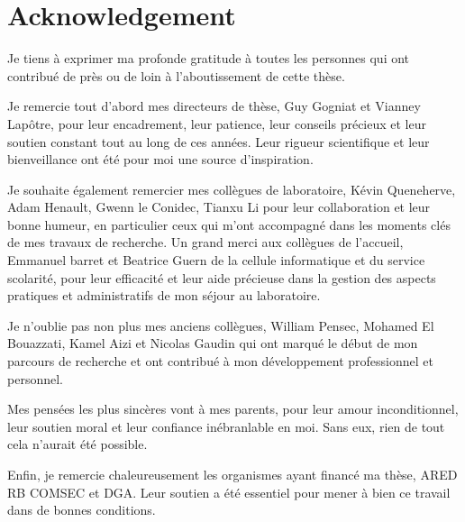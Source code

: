 \chapter*{Acknowledgement}

Je tiens à exprimer ma profonde gratitude à toutes les personnes qui ont contribué de près ou de loin à l’aboutissement de cette thèse.

Je remercie tout d’abord mes directeurs de thèse, Guy Gogniat et Vianney Lapôtre, pour leur encadrement, leur patience, leur conseils précieux et leur soutien constant tout au long de ces années. Leur rigueur scientifique et leur bienveillance ont été pour moi une source d’inspiration.

Je souhaite également remercier mes collègues de laboratoire, Kévin Queneherve, Adam Henault, Gwenn le Conidec, Tianxu Li pour leur collaboration et leur bonne humeur, en particulier ceux qui m’ont accompagné dans les moments clés de mes travaux de recherche. Un grand merci aux collègues de l’accueil, Emmanuel barret et Beatrice Guern de la cellule informatique et du service scolarité, pour leur efficacité et leur aide précieuse dans la gestion des aspects pratiques et administratifs de mon séjour au laboratoire.

Je n’oublie pas non plus mes anciens collègues, William Pensec, Mohamed El Bouazzati, Kamel Aizi et Nicolas Gaudin qui ont marqué le début de mon parcours de recherche et ont contribué à mon développement professionnel et personnel.

Mes pensées les plus sincères vont à mes parents, pour leur amour inconditionnel, leur soutien moral et leur confiance inébranlable en moi. Sans eux, rien de tout cela n’aurait été possible.

Enfin, je remercie chaleureusement les organismes ayant financé ma thèse, ARED RB COMSEC et DGA. Leur soutien a été essentiel pour mener à bien ce travail dans de bonnes conditions.